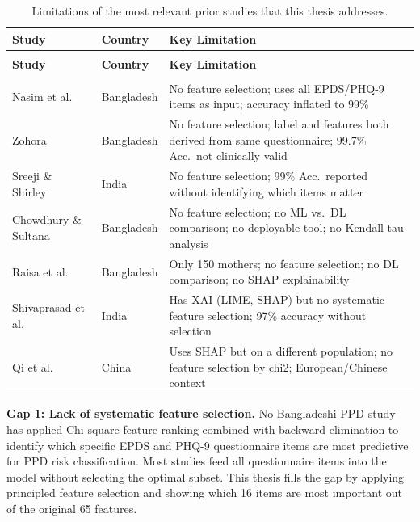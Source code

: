 \footnotesize
\begin{longtable}{|>{\raggedright\arraybackslash}p{}|>{\raggedright\arraybackslash}p{}|>{\raggedright\arraybackslash}p{}|}
\caption[Limitations of prior PPD prediction studies]{Limitations of the most relevant prior studies that this thesis addresses.}
\label{ch2-tbl-gaps} \\
\hline
\textbf{Study} & \textbf{Country} & \textbf{Key Limitation} \\
\hline
\endfirsthead
\multicolumn{3}{c}{\textit{Table~\ref{ch2-tbl-gaps} continued}} \\
\hline
\textbf{Study} & \textbf{Country} & \textbf{Key Limitation} \\
\hline
\endhead
\hline \multicolumn{3}{r}{\textit{Continued on next page}} \\
\endfoot
\hline
\endlastfoot

Nasim et al.~\cite{nasim2024novel} & Bangladesh & No feature selection; uses all EPDS/PHQ-9 items as input; accuracy inflated to 99\% \\
\hline
Zohora~\cite{zohora2024machine} & Bangladesh & No feature selection; label and features both derived from same questionnaire; 99.7\% Acc.\ not clinically valid \\
\hline
Sreeji \& Shirley~\cite{sreeji2026predicting} & India & No feature selection; 99\% Acc.\ reported without identifying which items matter \\
\hline
Chowdhury \& Sultana~\cite{chowdhury2026assessing} & Bangladesh & No feature selection; no ML vs.\ DL comparison; no deployable tool; no Kendall tau analysis \\
\hline
Raisa et al.~\cite{raisa2022machine} & Bangladesh & Only 150 mothers; no feature selection; no DL comparison; no SHAP explainability \\
\hline
Shivaprasad et al.~\cite{shivaprasad2024explainable} & India & Has XAI (LIME, SHAP) but no systematic feature selection; 97\% accuracy without selection \\
\hline
Qi et al.~\cite{qi2025prediction} & China & Uses SHAP but on a different population; no feature selection by chi2; European/Chinese context \\
\hline

\end{longtable}
\normalsize
\FloatBarrier

\textbf{Gap 1: Lack of systematic feature selection.}
No Bangladeshi PPD study has applied Chi-square feature ranking combined with backward elimination to identify which specific EPDS and PHQ-9 questionnaire items are most predictive for PPD risk classification. Most studies feed all questionnaire items into the model without selecting the optimal subset. This thesis fills the gap by applying principled feature selection and showing which 16 items are most important out of the original 65 features.

